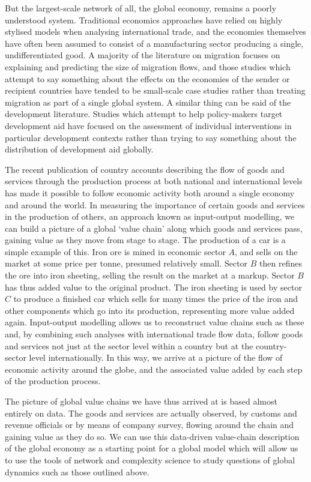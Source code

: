 \documentclass[preprint,authoryear,3p]{elsarticle}
\begin{document}
But the largest-scale network of all, the global economy, remains a poorly understood system. Traditional economics approaches have relied on highly stylised models when analysing international trade, and the economies themselves have often been assumed to consist of a manufacturing sector producing a single, undifferentiated good. A majority of the literature on migration focuses on explaining and predicting the size of migration flows, and those studies which attempt to say something about the effects on the economies of the sender or recipient countries have tended to be small-scale case studies rather than treating migration as part of a single global system. A similar thing can be said of the development literature. Studies which attempt to help policy-makers target development aid have focused on the assessment of individual interventions in particular development contexts rather than trying to say something about the distribution of development aid globally.

The recent publication of country accounts describing the flow of goods and services through the production process at both national and international levels has made it possible to follow economic activity both around a single economy and around the world. In measuring the importance of certain goods and services in the production of others, an approach known as input-output modelling, we can build a picture of a global `value chain' along  which goods and services pass, gaining value as they move from stage to stage. The production of a car is a simple example of this. Iron ore is mined in economic sector $A$, and sells on the market at some price per tonne, presumed relatively small. Sector $B$ then refines the ore into iron sheeting, selling the result on the market at a markup. Sector $B$ has thus added value to the original product. The iron sheeting is used by sector $C$ to produce a finished car which sells for many times the price of the iron and other components which go into its production, representing more value added again. Input-output modelling allows us to reconstruct value chains such as these and, by combining such analyses with international trade flow data, follow goods and services not just at the sector level within a country but at the country-sector level internationally. In this way, we arrive at a picture of the flow of economic activity around the globe, and the associated value added by each step of the production process.

The picture of global value chains we have thus arrived at is based almost entirely on data. The goods and services are actually observed, by customs and revenue officials or by means of company survey, flowing around the chain and gaining value as they do so. We can use this data-driven value-chain description of the global economy as a starting point for a global model which will allow us to use the tools of network and complexity science to study questions of global dynamics such as those outlined above.
\end{document}

